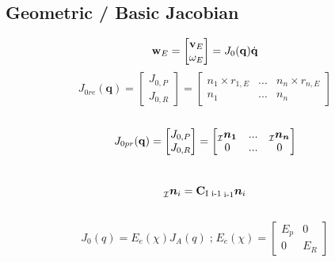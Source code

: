 \documentclass[a4paper, 8pt]{extarticle}
\newcommand{\mvec}[3]{  \prescript{}{\mathcal{#1}}{\bm{#2}}  _{#3} }
\newcommand{\mrot}[2]{ \textbf{#1}_{ \mathcal{#2} } }
\begin{document}
\begin{multicols*}{3}
\subsection{Geometric / Basic Jacobian}
$$\textbf{w}_E = \begin{bmatrix} \textbf v_E \\ \omega_E \end{bmatrix} = J_0(\mathbf q)\dot{\mathbf q}$$
$$J_{0 re}(\mathbf q) = \begin{bmatrix} 
J_{0,P} \\ J_{0,R} \end{bmatrix} = 
\begin{bmatrix}
 n_1 \times r_{1,E} & ... &  n_n \times r_{n,E} \\
 n_1 & ... &  n_n \end{bmatrix}$$\\
$$J_{0 pr}(\mathbf q) = \begin{bmatrix} 
J_{0,P} \\ J_{0,R} \end{bmatrix} = 
\begin{bmatrix}
\mvec{\mathcal{I}}{n_1}{}  & ... &  \mvec{\mathcal{I}}{n_n}{} \\
 0 & ... &  0 \end{bmatrix}$$\\
$$\mvec{I}{n}{i}=\mrot{C}{\text{I i-1}} \mvec{\text{i-1}}{n}{i}$$\\
$$J_{0}(q)=E_{e}(\chi)J_{A}(q) \; \textrm{;} \; E_{e}(\chi)=\begin{bmatrix}
E_{p} & 0\\ 0 & E_{R}
\end{bmatrix}$$\\




\end{multicols*}
\end{document}
